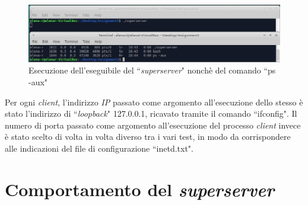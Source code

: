 \documentclass[a4paper, 12pt]{report}
\begin{document}
\begin{figure}[H]
	\centering
	\includegraphics[width=\linewidth]{images/launch_superserver.JPG}
	\caption{Esecuzione dell'eseguibile del ``\textit{superserver}" nonchè del comando ``ps -aux"}
\end{figure}

Per ogni \textit{client}, l'indirizzo \textit{IP} passato come argomento all'esecuzione dello stesso è 
stato l'indirizzo di ``\textit{loopback}" 127.0.0.1, ricavato tramite il comando ``ifconfig". Il numero di porta passato come argomento all'esecuzione del processo \textit{client}
invece è stato scelto di volta in volta diverso tra i vari test, in modo da corrispondere alle indicazioni del file di configurazione ``inetd.txt".

\section{Comportamento del \textit{superserver}}
\end{document}
